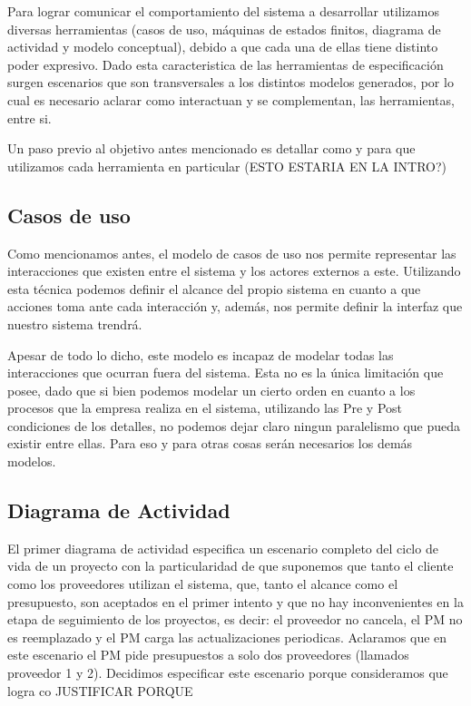 Para lograr comunicar el comportamiento del sistema a desarrollar utilizamos diversas herramientas (casos de uso, máquinas de estados finitos, diagrama de actividad y modelo conceptual), debido a que cada una de ellas tiene distinto poder expresivo.
Dado esta caracteristica de las herramientas de especificación surgen escenarios que son transversales a los distintos modelos generados, por lo cual es necesario aclarar como interactuan y se complementan, las herramientas, entre si.

Un paso previo al objetivo antes mencionado es detallar como y para que utilizamos cada herramienta en particular (ESTO ESTARIA EN LA INTRO?)
\subsection{Casos de uso}
Como mencionamos antes, el modelo de casos de uso nos permite representar las interacciones que existen entre
el sistema y los actores externos a este. Utilizando esta técnica podemos definir el alcance del propio sistema
en cuanto a que acciones toma ante cada interacción y, además, nos permite definir la interfaz que nuestro
sistema trendrá.

Apesar de todo lo dicho, este modelo es incapaz de modelar todas las interacciones que ocurran fuera del sistema.
Esta no es la única limitación que posee, dado que si bien podemos modelar un cierto orden en cuanto a los procesos
que la empresa realiza en el sistema, utilizando las Pre y Post condiciones de los detalles, no podemos dejar
claro ningun paralelismo que pueda existir entre ellas. Para eso y para otras cosas serán necesarios los demás modelos.   

\subsection{Diagrama de Actividad}
El primer diagrama de actividad especifica un escenario completo del ciclo de vida de un proyecto con la particularidad de que suponemos que tanto el cliente como los proveedores utilizan el sistema, que, tanto el alcance como el presupuesto, son aceptados en el primer intento y que no hay inconvenientes en la etapa de seguimiento de los proyectos, es decir: el proveedor no cancela, el PM no es reemplazado y el PM carga las actualizaciones periodicas. Aclaramos que en este escenario el PM pide presupuestos a solo dos proveedores (llamados proveedor 1 y 2). Decidimos especificar este escenario porque consideramos que logra co
JUSTIFICAR PORQUE

